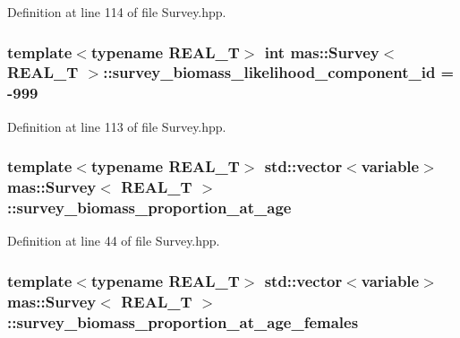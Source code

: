 Definition at line 114 of file Survey.\-hpp.

\hypertarget{structmas_1_1_survey_a4bb22fe02896841ef41d76172e0a8f91}{
\subsubsection[{survey\-\_\-biomass\-\_\-likelihood\-\_\-component\-\_\-id}]{\setlength{\rightskip}{0pt plus 5cm}template$<$typename R\-E\-A\-L\-\_\-\-T$>$ int {\bf mas\-::\-Survey}$<$ R\-E\-A\-L\-\_\-\-T $>$\-::survey\-\_\-biomass\-\_\-likelihood\-\_\-component\-\_\-id = -\/999}}\label{structmas_1_1_survey_a4bb22fe02896841ef41d76172e0a8f91}


Definition at line 113 of file Survey.\-hpp.

\hypertarget{structmas_1_1_survey_a6f6ec205376fb1a8d629117bd8e4a1d6}{
\subsubsection[{survey\-\_\-biomass\-\_\-proportion\-\_\-at\-\_\-age}]{\setlength{\rightskip}{0pt plus 5cm}template$<$typename R\-E\-A\-L\-\_\-\-T$>$ std\-::vector$<${\bf variable}$>$ {\bf mas\-::\-Survey}$<$ R\-E\-A\-L\-\_\-\-T $>$\-::survey\-\_\-biomass\-\_\-proportion\-\_\-at\-\_\-age}}\label{structmas_1_1_survey_a6f6ec205376fb1a8d629117bd8e4a1d6}


Definition at line 44 of file Survey.\-hpp.

\hypertarget{structmas_1_1_survey_a686876186e69ee392fb4ce0a481863ee}{
\subsubsection[{survey\-\_\-biomass\-\_\-proportion\-\_\-at\-\_\-age\-\_\-females}]{\setlength{\rightskip}{0pt plus 5cm}template$<$typename R\-E\-A\-L\-\_\-\-T$>$ std\-::vector$<${\bf variable}$>$ {\bf mas\-::\-Survey}$<$ R\-E\-A\-L\-\_\-\-T $>$\-::survey\-\_\-biomass\-\_\-proportion\-\_\-at\-\_\-age\-\_\-females}}\label{structmas_1_1_survey_a686876186e69ee392fb4ce0a481863ee}



